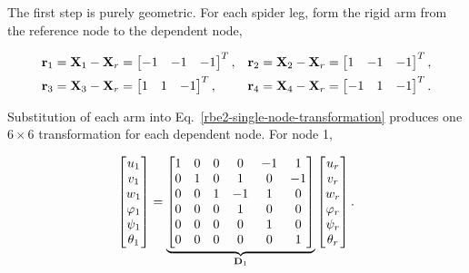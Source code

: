 The first step is purely geometric. For each spider leg, form the rigid arm from
the reference node to the dependent node,

\begin{equation}
\begin{aligned}
    \mathbf{r}_1&=\mathbf{X}_1-\mathbf{X}_r
       =\begin{bmatrix}-1&-1&-1\end{bmatrix}^{T}, &
    \mathbf{r}_2&=\mathbf{X}_2-\mathbf{X}_r
       =\begin{bmatrix} 1&-1&-1\end{bmatrix}^{T},\\
    \mathbf{r}_3&=\mathbf{X}_3-\mathbf{X}_r
       =\begin{bmatrix} 1& 1&-1\end{bmatrix}^{T}, &
    \mathbf{r}_4&=\mathbf{X}_4-\mathbf{X}_r
       =\begin{bmatrix}-1& 1&-1\end{bmatrix}^{T}.
\end{aligned}
\end{equation}

Substitution of each arm into Eq.~\eqref{rbe2-single-node-transformation}
produces one $6\times6$ transformation for each dependent node. For node 1,

\begin{equation}\label{rbe2-example-node1}
    \begin{bmatrix}
        u_1\\v_1\\w_1\\\varphi_1\\\psi_1\\\theta_1
    \end{bmatrix}
    =
    \underbrace{\begin{bmatrix}
        1&0&0& 0&-1& 1\\
        0&1&0& 1& 0&-1\\
        0&0&1&-1& 1& 0\\
        0&0&0& 1& 0& 0\\
        0&0&0& 0& 1& 0\\
        0&0&0& 0& 0& 1
    \end{bmatrix}}_{\mathbf{D}_1}
    \begin{bmatrix}
        u_r\\v_r\\w_r\\\varphi_r\\\psi_r\\\theta_r
    \end{bmatrix}.
\end{equation}

